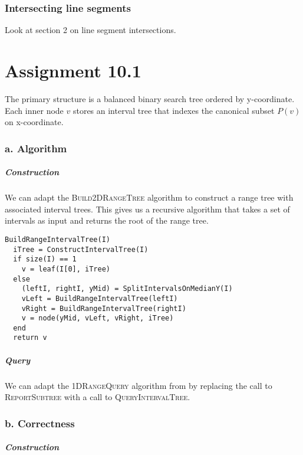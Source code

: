 \documentclass[10pt,a4paper,final,oneside,openany,article]{memoir}
\begin{document}
\subsection*{Intersecting line segments}
Look at section 2 on line segment intersections.


\chapter*{Assignment 10.1}
The primary structure is a balanced binary search tree ordered by y-coordinate. Each inner node $v$ stores an interval tree that indexes the canonical subset $P(v)$ on x-coordinate.

\subsection*{a. Algorithm}

\paragraph{Construction}
We can adapt the \textsc{ Build2DRangeTree} algorithm to construct a range tree with associated interval trees. This gives us a recursive algorithm that takes a set of intervals as input and returns the root of the range tree.
\begin{verbatim}
BuildRangeIntervalTree(I)  
  iTree = ConstructIntervalTree(I)
  if size(I) == 1
    v = leaf(I[0], iTree)
  else
    (leftI, rightI, yMid) = SplitIntervalsOnMedianY(I)
    vLeft = BuildRangeIntervalTree(leftI)
    vRight = BuildRangeIntervalTree(rightI)
    v = node(yMid, vLeft, vRight, iTree)
  end
  return v
\end{verbatim}

\paragraph{Query}
We can adapt the \textsc{ 1DRangeQuery} algorithm from \cite{deBerg} by replacing the call to \textsc{ ReportSubtree} with a call to \textsc{ QueryIntervalTree}.


\subsection*{b. Correctness}

\paragraph{Construction}
\end{document}
